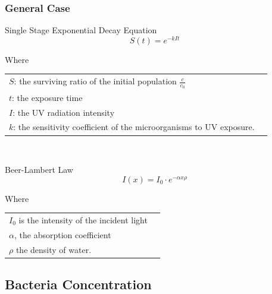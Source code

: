 \documentclass[xcolor=dvipsnames,10pt]{beamer}
\begin{document}
  \begin{frame}
          \frametitle{General Case}
          \begin{block}{Single Stage Exponential Decay Equation}
                  \begin{equation}
                          S(t)=e^{-kIt}
                  \end{equation}
          \end{block}
          Where 
                  {\footnotesize 
                  \begin{tabular}{ll}
                          $S$: the surviving ratio of the initial population $\frac{c}{c_0}$\\
                          $t$: the exposure time\\
                          $I$: the UV radiation intensity\\
                          $k$: the sensitivity coefficient of the microorganisms to UV exposure.
                  \end{tabular}
                  } \\


          \begin{block}{Beer-Lambert Law}
                  \begin{equation}
                          I(x) = I_0\cdot e^{-\alpha x\rho}
                  \end{equation}
          \end{block}
          Where 
                  {\footnotesize 
                          \begin{tabular}{ll}
                          $I_0$ is the intensity of the incident light\\
                          $\alpha$, the absorption coefficient\\
                          $\rho$ the density of water.
                  \end{tabular}
                  }

  \end{frame}


  \subsection{Bacteria Concentration}
\end{document}
